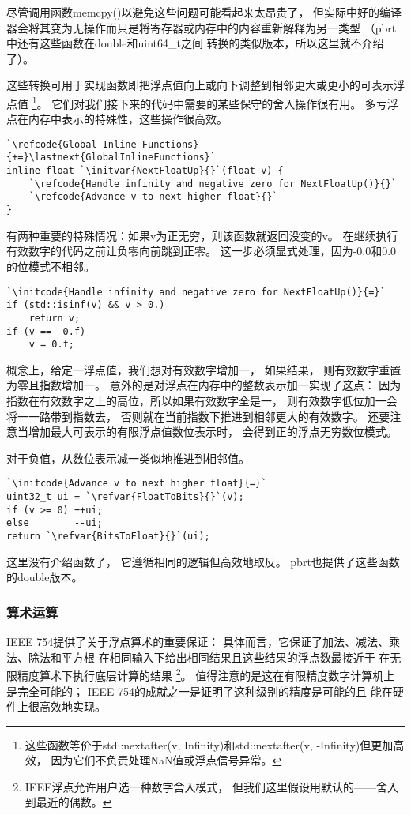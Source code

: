 尽管调用函数{\ttfamily memcpy()}以避免这些问题可能看起来太昂贵了，
但实际中好的编译器会将其变为无操作而只是将寄存器或内存中的内容重新解释为另一类型
（pbrt中还有这些函数在{\ttfamily double}和{\ttfamily uint64\_t}之间
转换的类似版本，所以这里就不介绍了）。

这些转换可用于实现函数即把浮点值向上或向下调整到相邻更大或更小的可表示浮点值
\footnote{这些函数等价于{\ttfamily std::nextafter(v, Infinity)}和{\ttfamily std::nextafter(v, -Infinity)}但更加高效，
因为它们不负责处理NaN值或浮点信号异常。}。
它们对我们接下来的代码中需要的某些保守的舍入操作很有用。
多亏浮点在内存中表示的特殊性，这些操作很高效。
\begin{lstlisting}
`\refcode{Global Inline Functions}{+=}\lastnext{GlobalInlineFunctions}`
inline float `\initvar{NextFloatUp}{}`(float v) {
    `\refcode{Handle infinity and negative zero for NextFloatUp()}{}`
    `\refcode{Advance v to next higher float}{}`
}
\end{lstlisting}

有两种重要的特殊情况：如果{\ttfamily v}为正无穷，则该函数就返回没变的{\ttfamily v}。
在继续执行有效数字的代码之前让负零向前跳到正零。
这一步必须显式处理，因为-0.0和0.0的位模式不相邻。
\begin{lstlisting}
`\initcode{Handle infinity and negative zero for NextFloatUp()}{=}`
if (std::isinf(v) && v > 0.)
    return v;
if (v == -0.f)
    v = 0.f;
\end{lstlisting}

概念上，给定一浮点值，我们想对有效数字增加一，
如果结果，
则有效数字重置为零且指数增加一。
意外的是对浮点在内存中的整数表示加一实现了这点：
因为指数在有效数字之上的高位，所以如果有效数字全是一，
则有效数字低位加一会将一一路带到指数去，
否则就在当前指数下推进到相邻更大的有效数字。
还要注意当增加最大可表示的有限浮点值数位表示时，
会得到正的浮点无穷数位模式。

对于负值，从数位表示减一类似地推进到相邻值。
\begin{lstlisting}
`\initcode{Advance v to next higher float}{=}`
uint32_t ui = `\refvar{FloatToBits}{}`(v);
if (v >= 0) ++ui;
else        --ui;
return `\refvar{BitsToFloat}{}`(ui);
\end{lstlisting}

这里没有介绍函数了，
它遵循相同的逻辑但高效地取反。
pbrt也提供了这些函数的{\ttfamily double}版本。

\subsubsection*{算术运算}
IEEE 754提供了关于浮点算术的重要保证：
具体而言，它保证了加法、减法、乘法、除法和平方根
在相同输入下给出相同结果且这些结果的浮点数最接近于
在无限精度算术下执行底层计算的结果
\footnote{IEEE浮点允许用户选一种数字舍入模式，
    但我们这里假设用默认的——舍入到最近的偶数。}。
值得注意的是这在有限精度数字计算机上是完全可能的；
IEEE 754的成就之一是证明了这种级别的精度是可能的且
能在硬件上很高效地实现。

